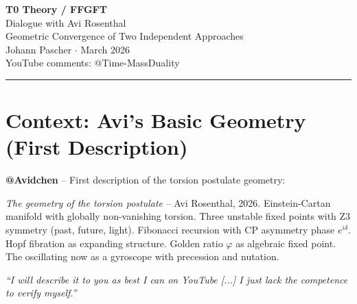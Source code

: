 \begin{center}
  {\LARGE\bfseries\color{T0blue} T0 Theory / FFGFT}\\[0.5em]
  {\large Dialogue with Avi Rosenthal}\\[0.3em]
  {\large Geometric Convergence of Two Independent Approaches}\\[1em]
  {\normalsize Johann Pascher \quad $\cdot$ \quad March 2026}\\[0.5em]
  {\small YouTube comments: @Time-MassDuality}
\end{center}

\vspace{1em}
\hrule
\vspace{1em}

\begin{abstract}
This document collects the scientific dialogue between T0 Theory / Fundamental Fractal Geometric Field Theory (FFGFT) and the geometry programme of Avi Rosenthal (2026). Both approaches converge independently on the same mathematical structures: fractal self-similarity, torus topology, Fibonacci dynamics, the golden ratio as geometric attractor, and the derivability of physical parameters from a single geometric source. The dialogue documents the step-by-step identification of points of contact and open research questions.
\end{abstract}

\tableofcontents
\newpage

\section{Context: Avi's Basic Geometry (First Description)}

\begin{avipost}
\textbf{@Avidchen} -- First description of the torsion postulate geometry:

\medskip
\textit{The geometry of the torsion postulate} -- Avi Rosenthal, 2026.
Einstein-Cartan manifold with globally non-vanishing torsion. Three unstable fixed points with Z3 symmetry (past, future, light). Fibonacci recursion with CP asymmetry phase $e^{i\delta}$. Hopf fibration as expanding structure. Golden ratio $\varphi$ as algebraic fixed point. The oscillating now as a gyroscope with precession and nutation.

\medskip
\textit{``I will describe it to you as best I can on YouTube [...] I just lack the competence to verify myself.''}
\end{avipost}

